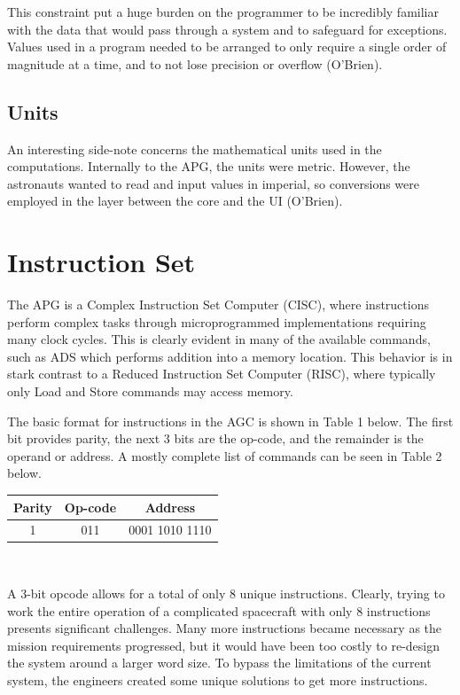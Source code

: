 \documentclass[a4paper,11pt]{article}
\begin{document}
This constraint put a huge burden on the programmer to be incredibly familiar with the data that would pass through a system and to safeguard for exceptions.  Values used in a program needed to be arranged to only require a single order of magnitude at a time, and to not lose precision or overflow (O'Brien).

\subsection{Units}
An interesting side-note concerns the mathematical units used in the computations.  Internally to the APG, the units were metric.  However, the astronauts wanted to read and input values in imperial, so conversions were employed in the layer between the core and the UI (O'Brien). 


\section{Instruction Set}
The APG is a Complex Instruction Set Computer (CISC), where instructions perform complex tasks through microprogrammed implementations requiring many clock cycles.  This is clearly evident in many of the available commands, such as ADS which performs addition into a memory location.  This behavior is in stark contrast to a Reduced Instruction Set Computer (RISC), where typically only Load and Store commands may access memory.  

The basic format for instructions in the AGC is shown in Table 1 below.  The first bit provides parity, the next 3 bits are the op-code, and the remainder is the operand or address.  A mostly complete list of commands can be seen in Table 2 below.

\begin{center}
\begin{tabular}{| c | c | c |}
  \hline	
  	Parity & Op-code & Address \\ \hline \hline
	1 & 011 & 0001 1010 1110 \\ \hline
\end{tabular} \\
\end{center}

A 3-bit opcode allows for a total of only 8 unique instructions.  Clearly, trying to work the entire operation of a complicated spacecraft with only 8 instructions presents significant challenges.  Many more instructions became necessary as the mission requirements progressed, but it would have been too costly to re-design the system around a larger word size.  To bypass the limitations of the current system, the engineers created some unique solutions to get more instructions.
\end{document}

